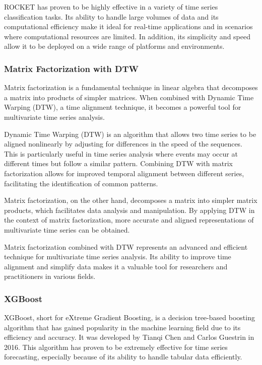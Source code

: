 ROCKET has proven to be highly effective in a variety of time series classification tasks. Its ability to handle large volumes of data and its computational efficiency make it ideal for real-time applications and in scenarios where computational resources are limited. In addition, its simplicity and speed allow it to be deployed on a wide range of platforms and environments.
\vspace{10pt}

\subsubsection{Matrix Factorization with DTW}
Matrix factorization is a fundamental technique in linear algebra that decomposes a matrix into products of simpler matrices. When combined with Dynamic Time Warping (DTW), a time alignment technique, it becomes a powerful tool for multivariate time series analysis.

Dynamic Time Warping (DTW)\cite{bringmann2023dynamicdynamictimewarping} is an algorithm that allows two time series to be aligned nonlinearly by adjusting for differences in the speed of the sequences. This is particularly useful in time series analysis where events may occur at different times but follow a similar pattern. Combining DTW with matrix factorization allows for improved temporal alignment between different series, facilitating the identification of common patterns.

Matrix factorization, on the other hand, decomposes a matrix into simpler matrix products, which facilitates data analysis and manipulation. By applying DTW in the context of matrix factorization, more accurate and aligned representations of multivariate time series can be obtained.

Matrix factorization combined with DTW represents an advanced and efficient technique for multivariate time series analysis. Its ability to improve time alignment and simplify data makes it a valuable tool for researchers and practitioners in various fields.
\vspace{10pt}

\subsubsection{XGBoost}
XGBoost\cite{Chen_2016}, short for eXtreme Gradient Boosting, is a decision tree-based boosting algorithm that has gained popularity in the machine learning field due to its efficiency and accuracy. It was developed by Tianqi Chen and Carlos Guestrin in 2016. This algorithm has proven to be extremely effective for time series forecasting, especially because of its ability to handle tabular data efficiently.

